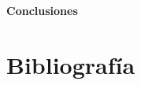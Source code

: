 \documentclass[11pt,letterpaper]{article}
\begin{document}
    \newpage
    \begin{center}
        \LARGE{\textbf{Conclusiones}}\\
    \end{center}
    \normalsize
    

    
\newpage

\Large \section*{Bibliografía}
  
  
  
    
	
\end{document}
